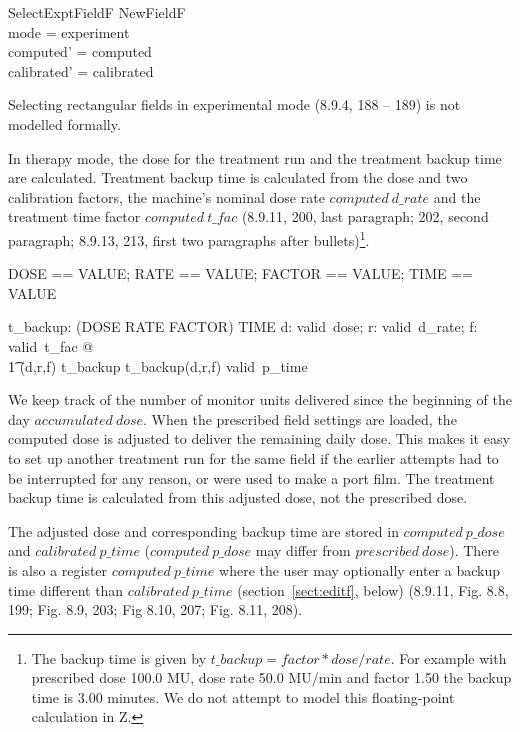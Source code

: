 \documentclass{article}
\begin{document}
\begin{schema}{SelectExptFieldF}
	NewFieldF \\
\where	
	mode = experiment \\
	computed' = computed \\
	calibrated' = calibrated \\
\end{schema}
Selecting rectangular fields in experimental mode (8.9.4, 188 -- 189)
is not modelled formally.

In therapy mode, the dose for the treatment run and the treatment
backup time are calculated.  Treatment backup time is calculated from
the dose and two calibration factors, the machine's nominal dose rate
$computed~d\_rate$ and the treatment time factor $computed~t\_fac$
(8.9.11, 200, last paragraph; 202, second paragraph; 8.9.13, 213,
first two paragraphs after bullets)\footnote{The backup time is given
by $t\_backup = factor * dose / rate$. For example with prescribed
dose 100.0 MU, dose rate 50.0 MU/min and factor 1.50 the backup time
is 3.00 minutes.  We do not attempt to model this floating-point
calculation in Z.}.

\begin{zed}
	DOSE == VALUE; RATE == VALUE; FACTOR == VALUE; TIME == VALUE
\end{zed}

\begin{axdef}
	t\_backup: (DOSE \cross RATE \cross FACTOR) \pfun TIME
\where
	\forall d: valid~dose; r: valid~d\_rate; f: valid~t\_fac @ \\
\t1	 (d,r,f) \in \dom t\_backup \land t\_backup(d,r,f) \in valid~p\_time
\end{axdef}
We keep track of the number of monitor units delivered since the
beginning of the day $accumulated~dose$.  When the prescribed field
settings are loaded, the computed dose is adjusted to deliver the
remaining daily dose.  This makes it easy to set up another treatment
run for the same field if the earlier attempts had to be interrupted for
any reason, or were used to make a port film.  The treatment backup time is
calculated from this adjusted dose, not the prescribed dose.

The adjusted dose and corresponding backup time are stored in
$computed~p\_dose$ and $calibrated~p\_time$ ($computed~p\_dose$ may
differ from $prescribed~dose$).  There is also a register
$computed~p\_time$ where the user may optionally enter a backup time
different than $calibrated~p\_time$ (section~\ref{sect:editf}, below)
(8.9.11, Fig. 8.8, 199; Fig. 8.9, 203; Fig 8.10, 207; Fig. 8.11, 208).
\end{document}
